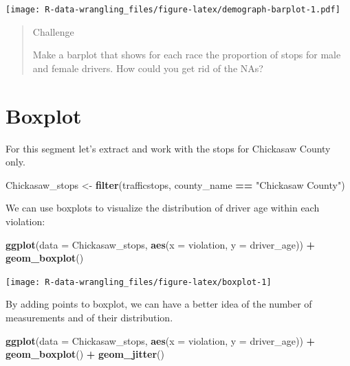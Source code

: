 \documentclass[]{book}
\newenvironment{Shaded}{\begin{snugshade}}{\end{snugshade}}
\newcommand{\DataTypeTok}[1]{\textcolor[rgb]{0.13,0.29,0.53}{#1}}
\newcommand{\KeywordTok}[1]{\textcolor[rgb]{0.13,0.29,0.53}{\textbf{#1}}}
\newcommand{\NormalTok}[1]{#1}
\newcommand{\OperatorTok}[1]{\textcolor[rgb]{0.81,0.36,0.00}{\textbf{#1}}}
\newcommand{\StringTok}[1]{\textcolor[rgb]{0.31,0.60,0.02}{#1}}
\begin{document}
\texttt{[image: R-data-wrangling\_files/figure-latex/demograph-barplot-1.pdf]}

\begin{quote}
Challenge

Make a barplot that shows for each race the proportion of stops for male and female drivers. How could you get rid of the NAs?
\end{quote}

\hypertarget{boxplot}{%
\section{Boxplot}\label{boxplot}}

For this segment let's extract and work with the stops for Chickasaw County only.

\begin{Shaded}
\begin{Highlighting}[]
\NormalTok{Chickasaw_stops <-}\StringTok{ }\KeywordTok{filter}\NormalTok{(trafficstops, county_name }\OperatorTok{==}\StringTok{ "Chickasaw County"}\NormalTok{)}
\end{Highlighting}
\end{Shaded}

We can use boxplots to visualize the distribution of driver age within each violation:

\begin{Shaded}
\begin{Highlighting}[]
\KeywordTok{ggplot}\NormalTok{(}\DataTypeTok{data =}\NormalTok{ Chickasaw_stops, }\KeywordTok{aes}\NormalTok{(}\DataTypeTok{x =}\NormalTok{ violation, }\DataTypeTok{y =}\NormalTok{ driver_age)) }\OperatorTok{+}
\StringTok{    }\KeywordTok{geom_boxplot}\NormalTok{()}
\end{Highlighting}
\end{Shaded}

\texttt{[image: R-data-wrangling\_files/figure-latex/boxplot-1]}

By adding points to boxplot, we can have a better idea of the number of
measurements and of their distribution.

\begin{Shaded}
\begin{Highlighting}[]
\KeywordTok{ggplot}\NormalTok{(}\DataTypeTok{data =}\NormalTok{ Chickasaw_stops, }\KeywordTok{aes}\NormalTok{(}\DataTypeTok{x =}\NormalTok{ violation, }\DataTypeTok{y =}\NormalTok{ driver_age)) }\OperatorTok{+}
\StringTok{    }\KeywordTok{geom_boxplot}\NormalTok{() }\OperatorTok{+}
\StringTok{    }\KeywordTok{geom_jitter}\NormalTok{()}
\end{Highlighting}
\end{Shaded}
\end{document}
